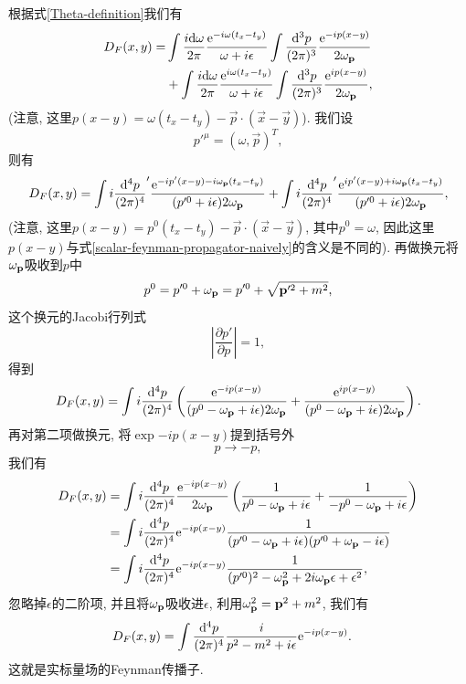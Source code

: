 根据式\eqref{Theta-definition}我们有
\begin{align}
    D_F(x, y)=&\int\frac{i\d\omega}{2\pi}\frac{\exp{-i\omega(t_x-t_y)}}{\omega+i\epsilon}\int\ld p[\exp{-ip(x-y)}]\notag\\
    &+\int\frac{i\d\omega}{2\pi}\frac{\exp{i\omega(t_x-t_y)}}{\omega+i\epsilon}\int\ld p[\exp{ip(x-y)}]\label{scalar-feynman-propagator-naively},
\end{align}
(注意, 这里$p(x-y)=\omega(t_x-t_y)-\vec p\cdot(\vec x-\vec y)$). 我们设
\begin{equation}
    p'^\mu=(\omega, \vec p)^T,
\end{equation}
则有
\begin{equation}
    D_F(x, y)=\int i\frac{\mathrm d^4p}{(2\pi)^4}'\frac{\mathrm e^{-ip'(x-y)-i\omega_{\mathbf{p}}(t_x-t_y)}}{(p'^0+i\epsilon)2\omega_{\mathbf{p}}}+\int i\frac{\mathrm d^4p}{(2\pi)^4}'\frac{\mathrm e^{ip'(x-y)+i\omega_{\mathbf{p}}(t_x-t_y)}}{(p'^0+i\epsilon)2\omega_{\mathbf{p}}},
\end{equation}
(注意, 这里$p(x-y)=p^0(t_x-t_y)-\vec p\cdot(\vec x-\vec y)$, 其中$p^0=\omega$, 因此这里$p(x-y)$与式\eqref{scalar-feynman-propagator-naively}的含义是不同的). 再做换元将$\omega_{\mathbf{p}}$吸收到$p$中
\begin{equation}
    p^0=p'^0+\omega_{\mathbf{p}}=p'^0+\sqrt{\mathbf{p}'^2+m^2},
\end{equation}
这个换元的Jacobi行列式
\begin{equation}
    |\frac{\partial p'}{\partial p}|=1,
\end{equation}
得到
\begin{equation}
    D_F(x, y)=\int i\frac{\mathrm d^4p}{(2\pi)^4}\left(\frac{\mathrm e^{-ip(x-y)}}{(p^0-\omega_{\mathbf{p}}+i\epsilon)2\omega_{\mathbf{p}}}+\frac{\mathrm e^{ip(x-y)}}{(p^0-\omega_{\mathbf{p}}+i\epsilon)2\omega_{\mathbf{p}}}\right).
\end{equation}
再对第二项做换元, 将$\exp{-ip(x-y)}$提到括号外
\begin{equation}
    p\to -p,
\end{equation}
我们有
\begin{align}
    D_F(x, y)&=\int i\frac{\mathrm d^4p}{(2\pi)^4}\frac{\mathrm e^{-ip(x-y)}}{2\omega_{\mathbf{p}}}\left(\frac{1}{p^0-\omega_{\mathbf{p}}+i\epsilon}+\frac{1}{-p^0-\omega_{\mathbf{p}}+i\epsilon}\right)\\
    &=\int i\frac{\mathrm d^4p}{(2\pi)^4}\mathrm e^{-ip(x-y)}\frac1{(p'^0-\omega_{\mathbf{p}}+i\epsilon)(p'^0+\omega_{\mathbf{p}}-i\epsilon)}\\
    &=\int i\frac{\mathrm d^4p}{(2\pi)^4}\mathrm e^{-ip(x-y)}\frac1{(p'^0)^2-\omega_{\mathbf{p}}^2+2i\omega_{\mathbf{p}}\epsilon+\epsilon^2},
\end{align}
忽略掉$\epsilon$的二阶项, 并且将$\omega_{\mathbf{p}}$吸收进$\epsilon$, 利用$\omega_{\mathbf{p}}^2=\mathbf{p}^2+m^2$, 我们有
\begin{align}
    D_F(x, y)&=\int\frac{\mathrm d^4p}{(2\pi)^4}\frac i{p^2-m^2+i\epsilon}\mathrm e^{-ip(x-y)}.
\end{align}
这就是实标量场的Feynman传播子.

